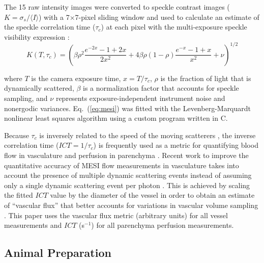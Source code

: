 \documentclass[review]{elsarticle}
\begin{document}
The 15 raw intensity images were converted to speckle contrast images ($K = \sigma_{s} / {\langle{I}\rangle}$) with a 7$\times$7-pixel sliding window and used to calculate an estimate of the speckle correlation time ($\tau_c$) at each pixel with the multi-exposure speckle visibility expression \cite{Parthasarathy:2008el}:
%
\begin{equation}
    \label{eq:mesi}
    K(T,\tau_c) =
        \left(
        \beta\rho^2\frac{e^{-2x} - 1 + 2x}{2x^2} +
        4\beta\rho(1 - \rho)\frac{e^{-x} - 1 + x}{x^2} +
        \nu
        \right)^{1/2}
\end{equation}

\noindent where $T$ is the camera exposure time, $x = T/\tau_c$, $\rho$ is the fraction of light that is dynamically scattered, $\beta$ is a normalization factor that accounts for speckle sampling, and $\nu$ represents exposure-independent instrument noise and nonergodic variances. Eq.~(\ref{eq:mesi}) was fitted with the Levenberg-Marquardt nonlinear least squares algorithm \cite{Lourakis:J2fCMU5i} using a custom program written in C.

Because $\tau_c$ is inversely related to the speed of the moving scatterers \cite{Bonner:1981hg,Briers:1996kfa}, the inverse correlation time ($ICT = 1/\tau_c$) is frequently used as a metric for quantifying blood flow in vasculature and perfusion in parenchyma \cite{Ayata:2004ba,Strong:2005kj,Sullender:2018ff}. Recent work to improve the quantitative accuracy of MESI flow measurements in vasculature takes into account the presence of multiple dynamic scattering events instead of assuming only a single dynamic scattering event per photon \cite{Kazmi:2015du}. This is achieved by scaling the fitted $ICT$ value by the diameter of the vessel in order to obtain an estimate of ``vascular flux'' that better accounts for variations in vascular volume sampling \cite{Kazmi:2015du,Richards:2017df}. This paper uses the vascular flux metric (arbitrary units) for all vessel measurements and $ICT$ (s$^{-1}$) for all parenchyma perfusion measurements.



\subsection{Animal Preparation}
\end{document}

